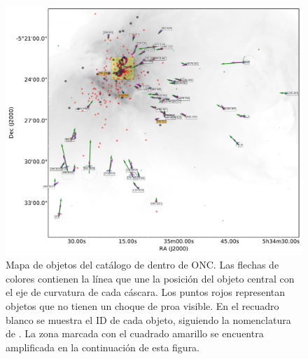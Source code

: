 \begin{figure}
  \centering
    \includegraphics[width=\linewidth]{./Figures/ll-pos-image-Luis}
  \caption[Mapa de objetos del catálogo de \citet{Gutierrez-Soto:2015a} dentro de ONC]{Mapa de objetos del catálogo de \citet{Gutierrez-Soto:2015a} dentro de ONC. Las flechas de colores contienen la línea que une la posición del objeto central con el eje de curvatura de cada cáscara. Los puntos rojos representan objetos que no tienen un choque de proa visible. En el recuadro blanco se muestra el ID de cada objeto, siguiendo la nomenclatura de \citet{ODell:1994a}. La zona marcada con el cuadrado amarillo se encuentra amplificada en la continuación de esta figura.}
  \label{fig:orion-map-LL}
\end{figure}

